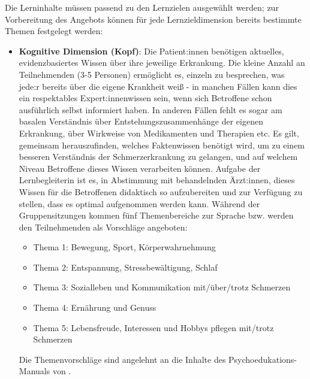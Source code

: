 \documentclass[
  twoside,
  parskip=half-,
  paper=176mm:246mm,
  BCOR=14mm,
  DIV=14,
]{scrreprt}
\begin{document}
\begin{praxis}
Die Lerninhalte müssen passend zu den Lernzielen ausgewählt werden; zur Vorbereitung des Angebots können für jede Lernzieldimension bereits bestimmte Themen festgelegt werden:
\begin{itemize}
  \item \textbf{Kognitive Dimension (Kopf)}: Die Patient:innen benötigen aktuelles, evidenzbasiertes Wissen über ihre jeweilige Erkrankung. Die kleine Anzahl an Teilnehmenden (3-5 Personen) ermöglicht es, einzeln zu besprechen, was jede:r bereits über die eigene Krankheit weiß - in manchen Fällen kann dies ein respektables Expert:innenwissen sein, wenn sich Betroffene schon ausführlich selbst informiert haben. In anderen Fällen fehlt es sogar am basalen Verständnis über Entstehungszusammenhänge der eigenen Erkrankung, über Wirkweise von Medikamenten und Therapien etc. Es gilt, gemeinsam herauszufinden, welches Faktenwissen benötigt wird, um zu einem besseren Verständnis der Schmerzerkrankung zu gelangen, und auf welchem Niveau Betroffene dieses Wissen verarbeiten können. Aufgabe der Lernbegleiterin ist es, in Abstimmung mit behandelnden Ärzt:innen, dieses Wissen für die Betroffenen didaktisch so aufzubereiten und zur Verfügung zu stellen, dass es optimal aufgenommen werden kann. Während der Gruppensitzungen kommen fünf Themenbereiche zur Sprache bzw. werden den Teilnehmenden als Vorschläge angeboten:
  \begin{itemize}
    \item Thema 1: Bewegung, Sport, Körperwahrnehmung
    \item Thema 2: Entspannung, Stressbewältigung, Schlaf 
    \item Thema 3: Sozialleben und Kommunikation mit/über/trotz Schmerzen
    \item Thema 4: Ernährung und Genuss 
    \item Thema 5: Lebensfreude, Interessen und Hobbys pflegen mit/trotz Schmerzen
  \end{itemize}
  
  Die Themenvorschläge sind angelehnt an die Inhalte des Psychoedukations-Manuals von \citeauthor{wachter}. 


\end{itemize}
\end{praxis}
\end{document}
